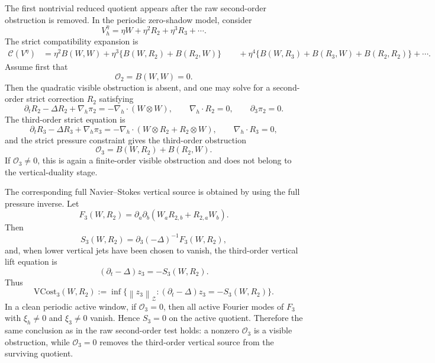 \documentclass[11pt]{article}
\numberwithin{equation}{section}
\newcommand{\nabh}{\nabla_h}
\newcommand{\divh}{\nabla_h\cdot}
\newcommand{\norm}[2]{\left\|#1\right\|_{#2}}
\newcommand{\calC}{\mathcal C}
\newcommand{\calO}{\mathcal O}
\newcommand{\calZ}{\mathcal Z}
\begin{document}
The first nontrivial reduced quotient appears after the raw second-order obstruction is removed.  In the periodic zero-shadow model, consider
\[
V_h^\eta=\eta W+\eta^2R_2+\eta^3R_3+\cdots.
\]
The strict compatibility expansion is
\begin{align*}
\calC(V^\eta)
&=
\eta^2B(W,W)
+\eta^3\{B(W,R_2)+B(R_2,W)\}\
&\quad+
\eta^4\{B(W,R_3)+B(R_3,W)+B(R_2,R_2)\}
+\cdots.
\end{align*}
Assume first that
\begin{equation}\label{eq:O2-zero}
\calO_2=B(W,W)=0.
\end{equation}
Then the quadratic visible obstruction is absent, and one may solve for a second-order strict correction \(R_2\) satisfying
\[
\partial_tR_2-\Delta R_2+\nabh\pi_2
=-\nabh\cdot(W\otimes W),
\qquad
\divh R_2=0,
\qquad
\partial_3\pi_2=0.
\]
The third-order strict equation is
\[
\partial_tR_3-\Delta R_3+\nabh\pi_3
=-\nabh\cdot(W\otimes R_2+R_2\otimes W),
\qquad
\divh R_3=0,
\]
and the strict pressure constraint gives the third-order obstruction
\begin{equation}\label{eq:O3-def}
\calO_3
=
B(W,R_2)+B(R_2,W).
\end{equation}
If \(\calO_3\ne0\), this is again a finite-order visible obstruction and does not belong to the vertical-duality stage.

The corresponding full Navier--Stokes vertical source is obtained by using the full pressure inverse.  Let
\[
F_3(W,R_2)=\partial_a\partial_b(W_aR_{2,b}+R_{2,a}W_b).
\]
Then
\begin{equation}\label{eq:S3-def}
S_3(W,R_2)=\partial_3(-\Delta)^{-1}F_3(W,R_2),
\end{equation}
and, when lower vertical jets have been chosen to vanish, the third-order vertical lift equation is
\begin{equation}\label{eq:VCost3-equation}
(\partial_t-\Delta)z_3=-S_3(W,R_2).
\end{equation}
Thus
\begin{equation}\label{eq:VCost3-def}
\mathrm{VCost}_3(W,R_2)
:=
\inf\{\norm{z_3}{\calZ}:(\partial_t-\Delta)z_3=-S_3(W,R_2)\}.
\end{equation}
In a clean periodic active window, if \(\calO_3=0\), then all active Fourier modes of \(F_3\) with \(\xi_h\ne0\) and \(\xi_3\ne0\) vanish.  Hence \(S_3=0\) on the active quotient.  Therefore the same conclusion as in the raw second-order test holds: a nonzero \(\calO_3\) is a visible obstruction, while \(\calO_3=0\) removes the third-order vertical source from the surviving quotient.
\end{document}
